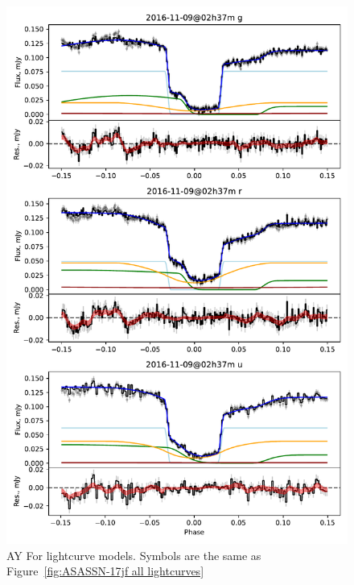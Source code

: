\begin{figure}
    \centering
    \includegraphics[width=\textwidth]{figures/results/AYFor/AYFor_1.pdf}
    \caption{AY For lightcurve models. Symbols are the same as Figure~\ref{fig:ASASSN-17jf all lightcurves}}
    \label{fig:AYFor all lightcurves}
\end{figure}
